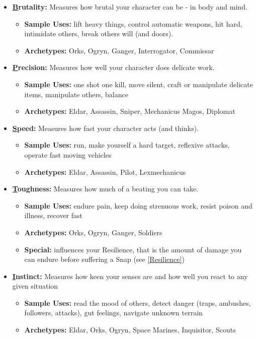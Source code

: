 	\begin{itemize}
		\item {\large\textbf{\underline{B}rutality:}} Measures how brutal your character can be - in body and mind.
		\begin{itemize}
			\item \textbf{Sample Uses:} lift heavy things, control automatic weapons, hit hard, intimidate others, break others will (and doors).
			\item \textbf{Archetypes:} Orks, Ogryn, Ganger, Interrogator, Commissar
		\end{itemize}

		\item {\large\textbf{\underline{P}recision:}} Measures how well your character does delicate work.
		\begin{itemize}
			\item \textbf{Sample Uses:} one shot one kill, move silent, craft or manipulate delicate items, manipulate others, balance
			\item \textbf{Archetypes:} Eldar, Assassin, Sniper, Mechanicus Magos, Diplomat
		\end{itemize}

		\item {\large\textbf{\underline{S}peed:}} Measures how fast your character acts (and thinks).
		\begin{itemize}
			\item \textbf{Sample Uses:} run, make yourself a hard target, reflexive attacks, operate fast moving vehicles
			\item \textbf{Archetypes:} Eldar, Assassin, Pilot, Lexmechanicus
		\end{itemize}

		\item {\large\textbf{\underline{T}oughness:}} Measures how much of a beating you can take.
		\begin{itemize}
			\item \textbf{Sample Uses:} endure pain, keep doing strenuous work, resist poison and illness, recover fast
			\item \textbf{Archetypes:} Orks, Ogryn, Ganger, Soldiers
			\item \textbf{Special:} influences your Resilience, that is the amount of damage you can endure before suffering a Snap (see \ref{Resilience})
		\end{itemize}

		\item {\large\textbf{\underline{I}nstinct:}} Measures how keen your senses are and how well you react to any given situation
		\begin{itemize}
			\item \textbf{Sample Uses:} read the mood of others, detect danger (traps, ambushes, followers, attacks), gut feelings, navigate unknown terrain
			\item \textbf{Archetypes:} Eldar, Orks, Ogryn, Space Marines, Inquisitor, Scouts
		\end{itemize}


\end{itemize}
